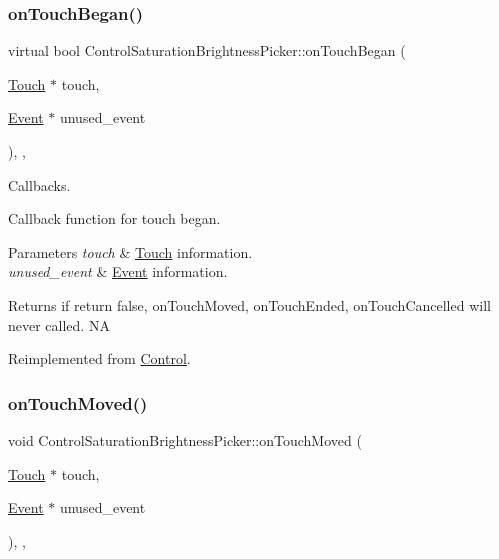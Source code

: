 \subsubsection{\texorpdfstring{on\+Touch\+Began()}{onTouchBegan()}\hspace{0.1cm}{\footnotesize\ttfamily [2/2]}}
{\footnotesize\ttfamily virtual bool Control\+Saturation\+Brightness\+Picker\+::on\+Touch\+Began (\begin{DoxyParamCaption}\item[{\hyperlink{classTouch}{Touch} $\ast$}]{touch,  }\item[{\hyperlink{classEvent}{Event} $\ast$}]{unused\+\_\+event }\end{DoxyParamCaption})\hspace{0.3cm}{\ttfamily [override]}, {\ttfamily [protected]}, {\ttfamily [virtual]}}



Callbacks. 

Callback function for touch began.


\begin{DoxyParams}{Parameters}
{\em touch} & \hyperlink{classTouch}{Touch} information. \\
\hline
{\em unused\+\_\+event} & \hyperlink{classEvent}{Event} information. \\
\hline
\end{DoxyParams}
\begin{DoxyReturn}{Returns}
if return false, on\+Touch\+Moved, on\+Touch\+Ended, on\+Touch\+Cancelled will never called.  NA 
\end{DoxyReturn}


Reimplemented from \hyperlink{classControl_a0cf2e20cea5b57b263e965be4a19ab52}{Control}.

\mbox{\label{classControlSaturationBrightnessPicker_aea0bada57d1f6e2bb3f456e77e342979}} 
\subsubsection{\texorpdfstring{on\+Touch\+Moved()}{onTouchMoved()}\hspace{0.1cm}{\footnotesize\ttfamily [1/2]}}
{\footnotesize\ttfamily void Control\+Saturation\+Brightness\+Picker\+::on\+Touch\+Moved (\begin{DoxyParamCaption}\item[{\hyperlink{classTouch}{Touch} $\ast$}]{touch,  }\item[{\hyperlink{classEvent}{Event} $\ast$}]{unused\+\_\+event }\end{DoxyParamCaption})\hspace{0.3cm}{\ttfamily [override]}, {\ttfamily [protected]}, {\ttfamily [virtual]}}

